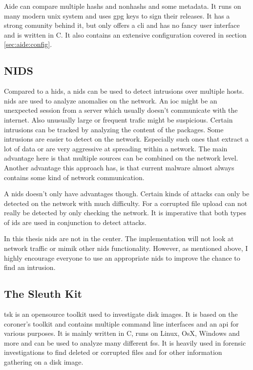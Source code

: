 Aide can compare multiple \glspl{hash} and \glspl{nonhash} and some \gls{metadata}. It runs on many modern unix system \cite{aide} and uses gpg keys to sign their releases. It has a strong comunity behind it, but only offers a \gls{cli} and has no fancy user interface and is written in C. \cite{aide:github} It also contains an extensive configuration covered in section \ref{sec:aide:config}.


\subsection{NIDS}
\label{sec:def:nids}

Compared to a \gls{hids}, a \gls{nids} can be used to detect intrusions over multiple hosts. \gls{nids} are used to analyze anomalies on the network. An \gls{ioc}	might be an unexpected session from a server which usually doesn't communicate with the internet. Also unusually large or frequent trafic might be suspicious. Certain intrusions can be tracked by analyzing the content of the packages. Some intrusions are easier to detect on the network. Especially such ones that extract a lot of data or are very aggressive at spreading within a network. The main advantage here is that multiple sources can be combined on the network level. Another advantage this approach has, is that current \gls{malware} almost always contains some kind of network communication. \cite{Malware:Behaviour,nids}

A \gls{nids} doesn't only have advantages though. Certain kinds of attacks can only be detected on the network with much difficulty. For a corrupted file upload can not really be detected by only checking the network. It is imperative that both types of \gls{ids} are used in conjunction to detect attacks. 

In this thesis \gls{nids} are not in the center. The implementation will not look at network traffic or mimik other \gls{nids} functionality. However, as mentioned above, I highly encourage everyone to use an appropriate \gls{nids} to improve the chance to find an intrusion. 

\subsection{The Sleuth Kit}
\label{sec:tsk}

\gls{tsk} is an \gls{opensource} toolkit used to investigate disk images. It is based on the coroner's toolkit \cite{tct} and contains multiple command line interfaces and an \gls{api} for various purposes. \cite{tsk, tsk:about} It is mainly written in C, runs on Linux, OsX, Windows and more and can be used to analyze many different \glspl{fs}. It is heavily used in forensic investigations to find deleted or corrupted files and for other information gathering on a disk image.

